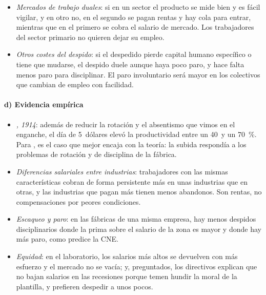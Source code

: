 \documentclass[11pt]{article}
\begin{document}
\begin{itemize}
\item \emph{Mercados de trabajo duales}: si en un sector el producto se mide bien y es fácil vigilar, y en otro no, en el segundo se pagan rentas y hay cola para entrar, mientras que en el primero se cobra el salario de mercado. Los trabajadores del sector primario no quieren dejar su empleo\nocite{BulowSummers1986Theory}.
\item \emph{Otros costes del despido}: si el despedido pierde capital humano específico o tiene que mudarse, el despido duele aunque haya poco paro, y hace falta menos paro para disciplinar. El paro involuntario será mayor en los colectivos que cambian de empleo con facilidad\nocite{ShapiroStiglitz1984Equilibrium}.
\end{itemize}

\paragraph{d) Evidencia empírica}

\begin{itemize}
\item \emph{, 1914}: además de reducir la rotación y el absentismo que vimos en el enganche, el día de 5~dólares elevó la productividad entre un 40~y un 70~\%\nocite{RaffSummers1986Ford}. Para \textcite{RaffSummers1987Ford}, es el caso que mejor encaja con la teoría: la subida respondía a los problemas de rotación y de disciplina de la fábrica.
\item \emph{Diferencias salariales entre industrias}: trabajadores con las mismas características cobran de forma persistente más en unas industrias que en otras, y las industrias que pagan más tienen menos abandonos. Son rentas, no compensaciones por peores condiciones\nocite{KruegerSummers1988Efficiency}.
\item \emph{Escaqueo y paro}: en las fábricas de una misma empresa, hay menos despidos disciplinarios donde la prima sobre el salario de la zona es mayor y donde hay más paro, como predice la CNE\nocite{CappelliChauvin1991Interplant}.
\item \emph{Equidad}: en el laboratorio, los salarios más altos se devuelven con más esfuerzo y el mercado no se vacía\nocite{FehrKirchsteigerRiedl1993Does}; y, preguntados, los directivos explican que no bajan salarios en las recesiones porque temen hundir la moral de la plantilla, y prefieren despedir a unos pocos\nocite{Bewley1999Why}.
\end{itemize}
\end{document}
